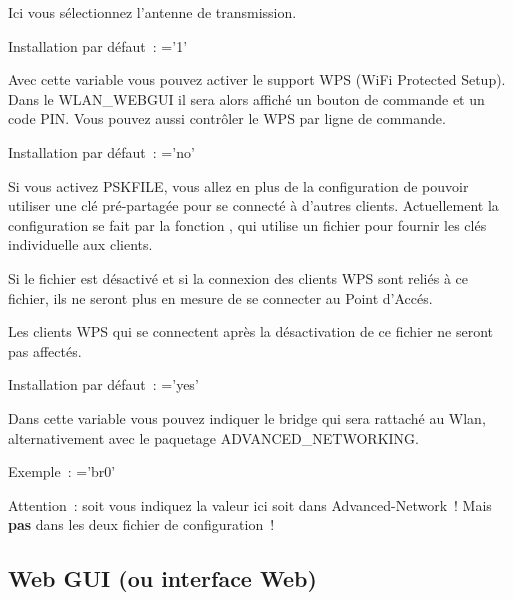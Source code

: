 \begin{description}

      Ici vous sélectionnez l'antenne de transmission.

      Installation par défaut~: ='1'


        Avec cette variable vous pouvez activer le support WPS (WiFi Protected Setup).
        Dans le WLAN\_WEBGUI il sera alors affiché un bouton de commande et un
        code PIN. Vous pouvez aussi contrôler le WPS par ligne de commande.

        Installation par défaut~: ='no'


        Si vous activez PSKFILE, vous allez en plus de la configuration de
         pouvoir utiliser une clé pré-partagée pour se
        connecté à d'autres clients. Actuellement la configuration se fait par
        la fonction , qui utilise un fichier pour fournir les
        clés individuelle aux clients.

        Si le fichier est désactivé et si la connexion des clients WPS sont
        reliés à ce fichier, ils ne seront plus en mesure de se connecter au
        Point d'Accés.

        Les clients WPS qui se connectent après la désactivation de ce fichier
        ne seront pas affectés.

        Installation par défaut~: ='yes'


        Dans cette variable vous pouvez indiquer le bridge qui sera rattaché au
        Wlan, alternativement avec le paquetage ADVANCED\_NETWORKING.

        Exemple~: ='br0'

        Attention~: soit vous indiquez la valeur ici soit dans Advanced-Network~!
                    Mais \textbf{pas} dans les deux fichier de configuration~!
\end{description}

\subsection {Web GUI (ou interface Web)}

